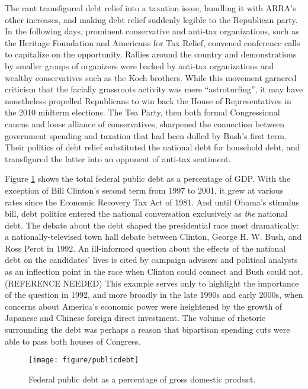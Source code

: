 \documentclass[
]{article}
\begin{document}
The rant transfigured debt relief into a taxation issue, bundling it with ARRA's other increases, and making debt relief suddenly legible to the Republican party.
In the following days, prominent conservative and anti-tax organizations, such as the Heritage Foundation and Americans for Tax Relief, convened conference calls to capitalize on the opportunity.
Rallies around the country and demonstrations by smaller groups of organizers were backed by anti-tax organizations and wealthy conservatives such as the Koch brothers.
While this movement garnered criticism that the facially grassroots activity was mere ``astroturfing'', it may have nonetheless propelled Republicans to win back the House of Representatives in the 2010 midterm elections.
The Tea Party, then both formal Congressional caucus and loose alliance of conservatives, sharpened the connection between government spending and taxation that had been dulled by Bush's first term.
Their politics of debt relief substituted the national debt for household debt, and transfigured the latter into an opponent of anti-tax sentiment.

Figure \ref{fig:publicdebt} shows the total federal public debt as a percentage of GDP.
With the exception of Bill Clinton's second term from 1997 to 2001, it grew at various rates since the Economic Recovery Tax Act of 1981.
And until Obama's stimulus bill, debt politics entered the national conversation exclusively as \emph{the} national debt.
The debate about the debt shaped the presidential race most dramatically: a nationally-televised town hall debate between Clinton, George H. W. Bush, and Ross Perot in 1992.
An ill-informed question about the effects of the national debt on the candidates' lives is cited by campaign advisers and political analysts as an inflection point in the race when Clinton could connect and Bush could not.(REFERENCE NEEDED)
This example serves only to highlight the importance of the question in 1992, and more broadly in the late 1990s and early 2000s, when concerns about America's economic power were heightened by the growth of Japanese and Chinese foreign direct investment.
The volume of rhetoric surrounding the debt was perhaps a reason that bipartisan spending cuts were able to pass both houses of Congress.

\begin{figure}

{\centering \texttt{[image: figure/publicdebt]}

}

\caption{Federal public debt as a percentage of gross domestic product.}\label{fig:publicdebt}
\end{figure}
\end{document}
